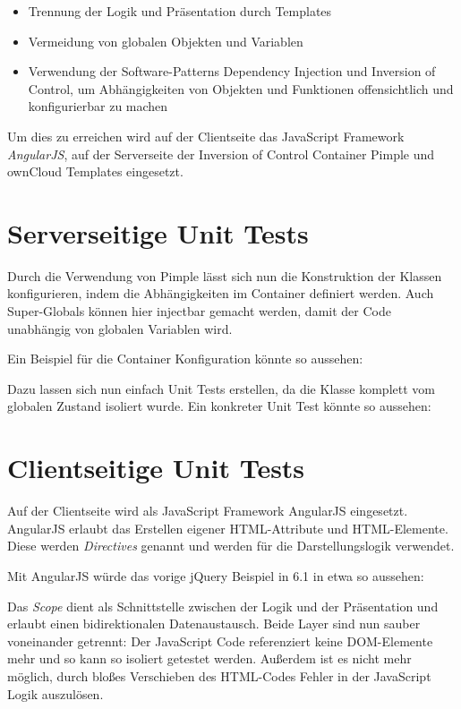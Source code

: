 \documentclass[a4paper,bibtotoc,oneside]{scrbook}
\begin{document}
\begin{itemize}
	\item Trennung der Logik und Präsentation durch Templates
	\item Vermeidung von globalen Objekten und Variablen
	\item Verwendung der Software-Patterns Dependency Injection und Inversion of Control, um Abhängigkeiten von Objekten und Funktionen offensichtlich und konfigurierbar zu machen
\end{itemize}

Um dies zu erreichen wird auf der Clientseite das JavaScript Framework \emph{AngularJS}\cite{angular}, auf der Serverseite der Inversion of Control Container Pimple\cite{pimple} und ownCloud Templates eingesetzt.


\section{Serverseitige Unit Tests}
Durch die Verwendung von Pimple lässt sich nun die Konstruktion der Klassen konfigurieren, indem die Abhängigkeiten im Container definiert werden. Auch Super-Globals können hier injectbar gemacht werden, damit der Code unabhängig von globalen Variablen wird. 

Ein Beispiel für die Container Konfiguration könnte so aussehen:


Dazu lassen sich nun einfach Unit Tests erstellen, da die Klasse komplett vom globalen Zustand isoliert wurde. Ein konkreter Unit Test könnte so aussehen:





\section{Clientseitige Unit Tests}
Auf der Clientseite wird als JavaScript Framework AngularJS eingesetzt. AngularJS erlaubt das Erstellen eigener HTML-Attribute und HTML-Elemente. Diese werden \emph{Directives} genannt und werden für die Darstellungslogik verwendet.

Mit AngularJS würde das vorige jQuery Beispiel in 6.1 in etwa so aussehen:




Das \emph{Scope} dient als Schnittstelle zwischen der Logik und der Präsentation und erlaubt einen bidirektionalen Datenaustausch. Beide Layer sind nun sauber voneinander getrennt: Der JavaScript Code referenziert keine DOM-Elemente mehr und so kann so isoliert getestet werden. Außerdem ist es nicht mehr möglich, durch bloßes Verschieben des HTML-Codes Fehler in der JavaScript Logik auszulösen.
\end{document}
